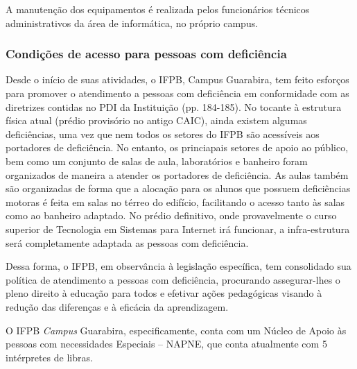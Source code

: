A manutenção dos equipamentos é realizada pelos funcionários técnicos administrativos da área de informática, no próprio campus.

\subsubsection{Condições de acesso para pessoas com deficiência}

	Desde o início de suas atividades, o IFPB, Campus Guarabira, tem feito esforços para promover o atendimento a pessoas com deficiência em conformidade com as diretrizes contidas no PDI da Instituição (pp. 184-185). No tocante à estrutura física atual (pr\'edio provis\'orio no antigo CAIC), ainda existem algumas defici\^encias, uma vez que nem todos os setores do IFPB são acessíveis aos portadores de defici\^encia. No entanto, os princiapais setores de apoio ao p\'ublico, bem como um conjunto de salas de aula, laborat\'orios e banheiro foram organizados de maneira a atender os portadores de defici\^encia. As aulas também são organizadas de forma que a alocação para os alunos que possuem deficiências motoras é feita em salas no térreo do edifício, facilitando o acesso tanto às salas como ao banheiro adaptado. No pr\'edio definitivo, onde provavelmente o curso superior de Tecnologia em Sistemas para Internet ir\'a funcionar, a infra-estrutura ser\'a completamente adaptada as pessoas com deficiência.

	Dessa forma, o IFPB, em observância à legislação específica, tem consolidado sua política de atendimento a pessoas com deficiência, procurando assegurar-lhes o pleno direito à educação para todos e efetivar ações pedagógicas visando à redução das diferenças e à eficácia da aprendizagem.
 
	O IFPB \textit{Campus} Guarabira, especificamente, conta com um Núcleo de Apoio às pessoas com necessidades Especiais – NAPNE, que conta atualmente com 5 intérpretes de libras. %



